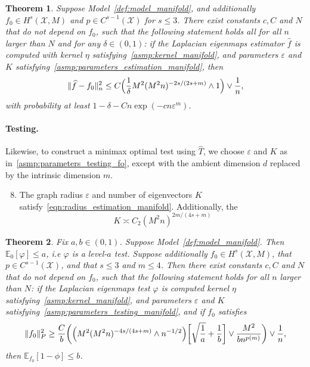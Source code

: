 \documentclass{article}
\newcommand{\1}{\mathbf{1}}
\newcommand{\mc}[1]{\mathcal{#1}}
\newcommand{\Ebb}{\mathbb{E}}
\newcommand{\wh}[1]{\widehat{#1}}
\theoremstyle{alden}
\theoremstyle{aldenthm}
\newtheorem{theorem}{Theorem}
\theoremstyle{definition}
\theoremstyle{remark}
\begin{document}
\begin{theorem}
	\label{thm:laplacian_eigenmaps_estimation_manifold}
	Suppose Model~\ref{def:model_manifold}, and additionally $f_0 \in H^s(\mc{X},M)$ and $p \in C^{s - 1}(\mc{X})$ for $s \leq 3$. There exist constants $c,C$ and $N$ that do not depend on $f_0$, such that the following statement holds all for all $n$ larger than $N$ and for any $\delta \in (0,1)$: if the Laplacian eigenmaps estimator $\wh{f}$ is computed with kernel $\eta$ satisfying~\ref{asmp:kernel_manifold}, and parameters $\varepsilon$ and $K$ satisfying~\ref{asmp:parameters_estimation_manifold}, then
	\begin{equation}
	\label{eqn:laplacian_eigenmaps_estimation_manifold}
	\|\wh{f} - f_0\|_n^2 \leq C\Bigl(\frac{1}{\delta}M^2(M^2n)^{-2s/(2s + m)} \wedge 1\Bigr) \vee \frac{1}{n},
	\end{equation}
	with probability at least $1 - \delta - Cn\exp(-cn\varepsilon^m)$.
\end{theorem}

\paragraph{Testing.}
Likewise, to construct a minimax optimal test using $\wh{T}$, we choose $\varepsilon$ and $K$ as in~\ref{asmp:parameters_testing_fo}, except with the ambient dimension $d$ replaced by the intrinsic dimension $m$.
\begin{enumerate}[label=(A\arabic*)]
	\setcounter{enumi}{7}
	\item 
	\label{asmp:parameters_testing_manifold}
	The graph radius $\varepsilon$ and number of eigenvectors $K$ satisfy~\eqref{eqn:radius_estimation_manifold}. Additionally, the
	\begin{equation*}
	K \asymp C_2 (M^2n)^{2m/(4s + m)}
	\end{equation*}
\end{enumerate}

\begin{theorem}
	\label{thm:laplacian_eigenmaps_testing_manifold}
	Fix $a,b \in (0,1)$. Suppose Model~\ref{def:model_manifold}. Then $\mathbb{E}_0[\varphi] \leq a$, i.e $\varphi$ is a level-$a$ test. Suppose additionally $f_0 \in H^s(\mc{X},M)$, that $p \in C^{s-1}(\mc{X})$, and that $s \leq 3$ and $m \leq 4$. Then there exist constants $c,C$ and $N$ that do not depend on $f_0$, such that the following statement holds for all $n$ larger than $N$: if the Laplacian eigenmaps test $\varphi$ is computed kernel $\eta$ satisfying~\ref{asmp:kernel_manifold}, and parameters $\varepsilon$ and $K$ satisfying~\ref{asmp:parameters_testing_manifold}, and if $f_0$ satisfies
	\begin{equation}
	\label{eqn:laplacian_eigenmaps_testing_criticalradius_manifold}
	\|f_0\|_P^2 \geq \frac{C}{b}\biggl(\Bigl(M^2(M^2n)^{-4s/(4s + m) } \wedge n^{-1/2}\Bigr)\biggl[\sqrt{\frac{1}{a}} + \frac{1}{b}\biggr] \vee \frac{M^2}{b n^{p(m)}} \biggr) \vee \frac{1}{n},
	\end{equation}
	then $\Ebb_{f_0}[1 - \phi] \leq b$.
\end{theorem}
\end{document}
